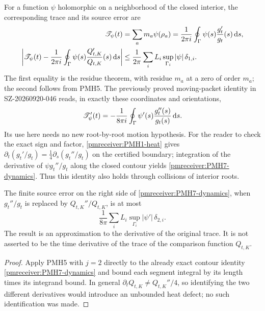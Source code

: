 \documentclass[11pt]{article}
\begin{document}
For a function $\psi$ holomorphic on a neighborhood of the closed
interior, the corresponding trace and its source error are
\begin{align}
 \mathscr T_\psi(t)&=\sum_am_a\psi(\rho_a)
    =\frac1{2\pi i}\oint_\Gamma\psi(s)\frac{g_t'}{g_t}(s)\,\mathrm d s,
 \label{pmreceiver:PMH7-trace}\\
 \left|\mathscr T_\psi(t)-\frac1{2\pi i}
 \oint_\Gamma\psi(s)\frac{Q_{t,K}'}{Q_{t,K}}(s)\,\mathrm d s\right|
 &\le\frac1{2\pi}\sum_iL_i\sup_{\Gamma_i}|\psi|\,\delta_{1,i}.
 \label{pmreceiver:PMH7-traceerror}
\end{align}
The first equality is the residue theorem, with residue $m_a$ at a
zero of order $m_a$; the second follows from PMH5. The previously
proved moving-packet identity in SZ-20260920-046 reads, in exactly
these coordinates and orientations,
\begin{equation}\label{pmreceiver:PMH7-dynamics}
 \mathscr T_\psi'(t)=-\frac1{8\pi i}\oint_\Gamma
       \psi'(s)\frac{g_t''(s)}{g_t(s)}\,\mathrm d s.
\end{equation}
Its use here needs no new root-by-root motion hypothesis. For the
reader to check the exact sign and factor, \eqref{pmreceiver:PMH1-heat} gives
$\partial_t(g_t'/g_t)=\tfrac14\partial_s(g_t''/g_t)$ on the
certified boundary; integration of the derivative of
$\psi g_t''/g_t$ along the closed contour yields
\eqref{pmreceiver:PMH7-dynamics}. Thus this identity also holds through
collisions of interior roots.

\begin{pmreceivertheorem}
\label{pmreceiver:PMH7}
The finite source error on the right side of
\eqref{pmreceiver:PMH7-dynamics}, when $g_t''/g_t$ is replaced by
$Q_{t,K}''/Q_{t,K}$, is at most
\begin{equation}\label{pmreceiver:PMH7-timeerror}
 \frac1{8\pi}\sum_iL_i\sup_{\Gamma_i}|\psi'|\,\delta_{2,i}.
\end{equation}
The result is an approximation to the derivative of the original
trace. It is not asserted to be the time derivative of the trace
of the comparison function $Q_{t,K}$.
\end{pmreceivertheorem}
\begin{proof}
Apply PMH5 with $j=2$ directly to the already exact contour
identity \eqref{pmreceiver:PMH7-dynamics} and bound each segment integral by
its length times its integrand bound. In general
$\partial_tQ_{t,K}\ne Q_{t,K}''/4$, so identifying the two
different derivatives would introduce an unbounded heat defect;
no such identification was made.
\end{proof}
\end{document}
